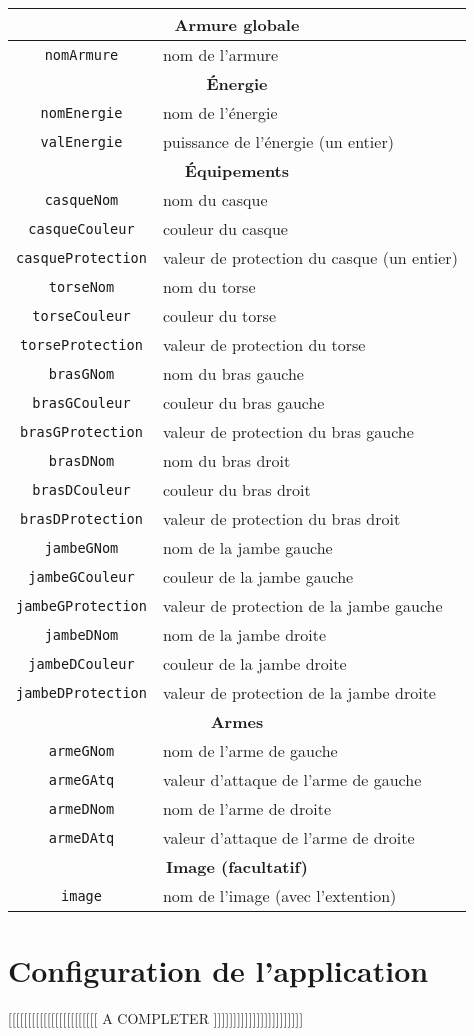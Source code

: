    \centering
	\begin{tabular}{|c|l|} 
		\hline
		\multicolumn{2}{|c|}{\textbf{Armure globale}} \\
		\hline
		\texttt{nomArmure} & nom de l'armure \\
		\hline
		\multicolumn{2}{|c|}{\textbf{\'Energie}} \\
		\hline
		\texttt{nomEnergie} & nom de l'énergie \\
		\texttt{valEnergie} & puissance de l'énergie (un entier) \\
		\hline
		\multicolumn{2}{|c|}{\textbf{\'Equipements}} \\
		\hline
		\texttt{casqueNom} & nom du casque \\
		\texttt{casqueCouleur} & couleur du casque \\
		\texttt{casqueProtection} & valeur de protection du casque (un entier) \\
		\texttt{torseNom} & nom du torse \\
		\texttt{torseCouleur} & couleur du torse \\
		\texttt{torseProtection} & valeur de protection du torse \\
		\texttt{brasGNom} & nom du bras gauche \\
		\texttt{brasGCouleur} & couleur du bras gauche \\
		\texttt{brasGProtection} & valeur de protection du bras gauche \\
		\texttt{brasDNom} & nom du bras droit \\
		\texttt{brasDCouleur} & couleur du bras droit \\
		\texttt{brasDProtection} & valeur de protection du bras droit \\
		\texttt{jambeGNom} & nom de la jambe gauche \\
		\texttt{jambeGCouleur} & couleur de la jambe gauche \\
		\texttt{jambeGProtection} & valeur de protection de la jambe gauche \\
		\texttt{jambeDNom} & nom de la jambe droite \\
		\texttt{jambeDCouleur} & couleur de la jambe droite \\
		\texttt{jambeDProtection} & valeur de protection de la jambe droite \\
		\hline
		\multicolumn{2}{|c|}{\textbf{Armes}} \\
		\hline
		\texttt{armeGNom} & nom de l'arme de gauche \\
		\texttt{armeGAtq} & valeur d'attaque de l'arme de gauche \\
		\texttt{armeDNom} & nom de l'arme de droite \\
		\texttt{armeDAtq} & valeur d'attaque de l'arme de droite \\
		\hline
		\multicolumn{2}{|c|}{\textbf{Image (facultatif)}} \\
		\hline
		\texttt{image} & nom de l'image (avec l'extention) \\
		\hline
	\end{tabular}


\section{Configuration de l'application}

[[[[[[[[[[[[[[[[[[[[[[[ A COMPLETER ]]]]]]]]]]]]]]]]]]]]]]]
